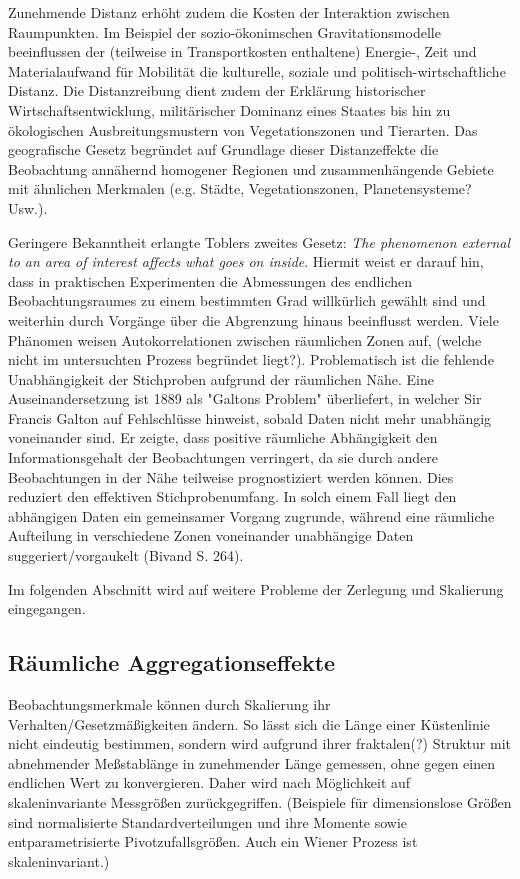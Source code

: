 Zunehmende Distanz erhöht zudem die Kosten der Interaktion zwischen Raumpunkten. 
Im Beispiel der sozio-ökonimschen Gravitationsmodelle beeinflussen 
der (teilweise in Transportkosten enthaltene) Energie-, Zeit und Materialaufwand für Mobilität  
die kulturelle, soziale und politisch-wirtschaftliche Distanz.
Die Distanzreibung dient zudem der Erklärung historischer Wirtschaftsentwicklung, 
militärischer Dominanz eines Staates 
bis hin zu ökologischen Ausbreitungsmustern von Vegetationszonen und Tierarten. 
Das geografische Gesetz begründet auf Grundlage dieser Distanzeffekte die Beobachtung annähernd 
homogener Regionen und zusammenhängende Gebiete mit 
ähnlichen Merkmalen (e.g. Städte, Vegetationszonen, Planetensysteme? Usw.).

Geringere Bekanntheit erlangte Toblers zweites Gesetz: 
\glqq\textit{The phenomenon external to an area 
of interest affects what goes on inside}\grqq{}.
Hiermit weist er darauf hin, dass in praktischen Experimenten die Abmessungen des endlichen 
Beobachtungsraumes zu einem bestimmten Grad willkürlich gewählt sind und weiterhin durch Vorgänge über 
die Abgrenzung hinaus beeinflusst werden. 
Viele Phänomen weisen Autokorrelationen zwischen räumlichen Zonen auf, (welche nicht im untersuchten Prozess begründet liegt?).
Problematisch ist die fehlende Unabhängigkeit der Stichproben aufgrund der räumlichen Nähe. 
Eine Auseinandersetzung ist 1889 als "Galtons Problem" überliefert, in welcher Sir Francis Galton auf Fehlschlüsse hinweist, sobald Daten nicht mehr unabhängig voneinander sind.
Er zeigte, dass positive räumliche Abhängigkeit den Informationsgehalt der Beobachtungen verringert, 
da sie durch andere Beobachtungen in der Nähe teilweise prognostiziert werden können. 
Dies reduziert den effektiven Stichprobenumfang. In solch einem Fall liegt den abhängigen Daten ein gemeinsamer Vorgang zugrunde, 
während eine räumliche Aufteilung in verschiedene Zonen voneinander unabhängige Daten suggeriert/vorgaukelt (Bivand S. 264).

Im folgenden Abschnitt wird auf weitere Probleme der Zerlegung und Skalierung eingegangen.

\subsection*{Räumliche Aggregationseffekte}
Beobachtungsmerkmale können durch Skalierung ihr Verhalten/Gesetzmäßigkeiten ändern. 
So lässt sich die Länge einer Küstenlinie nicht eindeutig bestimmen, sondern wird aufgrund ihrer 
fraktalen(?) Struktur mit abnehmender Meßstablänge in zunehmender Länge gemessen, 
ohne gegen einen endlichen Wert zu konvergieren. 
Daher wird nach Möglichkeit auf skaleninvariante Messgrößen zurückgegriffen.
(Beispiele für dimensionslose Größen sind normalisierte Standardverteilungen und ihre Momente sowie 
entparametrisierte Pivotzufallsgrößen. Auch ein Wiener Prozess ist skaleninvariant.)

